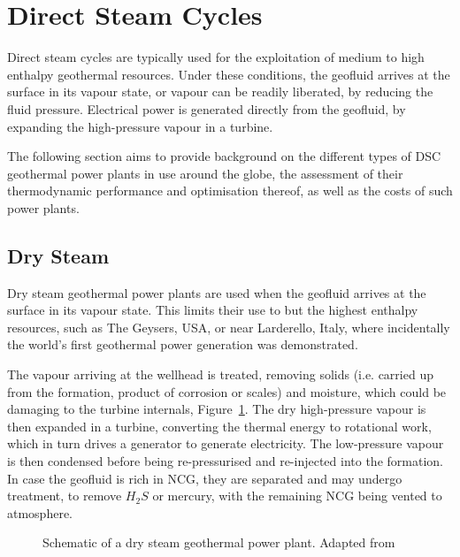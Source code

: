 \section{Direct Steam Cycles}
    Direct steam cycles are typically used for the exploitation of medium to high enthalpy geothermal resources. Under these conditions, the geofluid arrives at the surface in its vapour state, or vapour can be readily liberated, by reducing the fluid pressure. Electrical power is generated directly from the geofluid, by expanding the high-pressure vapour in a turbine.

    The following section aims to provide background on the different types of \ac{DSC} geothermal power plants in use around the globe, the assessment of their thermodynamic performance and optimisation thereof, as well as the costs of such power plants.

    \subsection{Dry Steam}
        Dry steam geothermal power plants are used when the geofluid arrives at the surface in its vapour state. This limits their use to but the highest enthalpy resources, such as The Geysers, USA, or near Larderello, Italy, where incidentally the world's first geothermal power generation was demonstrated.


        The vapour arriving at the wellhead is treated, removing solids (i.e. carried up from the formation, product of corrosion or scales) and moisture, which could be damaging to the turbine internals, Figure~\ref{fig:litrev_dry_steam_schematic}. The dry high-pressure vapour is then expanded in a turbine, converting the thermal energy to rotational work, which in turn drives a generator to generate electricity. The low-pressure vapour is then condensed before being re-pressurised and re-injected into the formation. In case the geofluid is rich in \ac{NCG}, they are separated and may undergo treatment, to remove \(H_2S\) or mercury, with the remaining \ac{NCG} being vented to atmosphere.

        \begin{figure}[H]
            \centering
            
            \caption{Schematic of a dry steam geothermal power plant. Adapted from \cite{DiPippo2016}}
            \label{fig:litrev_dry_steam_schematic}
        \end{figure}

